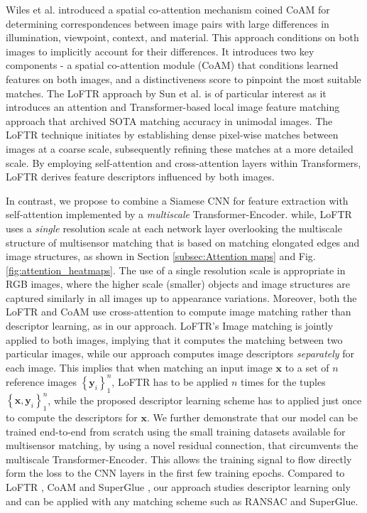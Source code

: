 \documentclass[10pt,journal]{IEEEtran}\usepackage{amsfonts}
\begin{document}
Wiles et al. introduced a spatial co-attention mechanism coined CoAM \cite {CoAM} for determining correspondences between image pairs with large
differences in illumination, viewpoint, context, and material. This approach
conditions on both images to implicitly account for their differences. It
introduces two key components - a spatial co-attention module (CoAM) that
conditions learned features on both images, and a distinctiveness score to
pinpoint the most suitable matches. The LoFTR approach \cite{LoFTR} by Sun
et al. is of particular interest as it introduces an attention and
Transformer-based local image feature matching approach that archived SOTA
matching accuracy in unimodal images. The LoFTR technique initiates by
establishing dense pixel-wise matches between images at a coarse scale,
subsequently refining these matches at a more detailed scale. By employing
self-attention and cross-attention layers within Transformers, LoFTR derives
feature descriptors influenced by both images.

In contrast, we propose to combine a Siamese CNN for feature extraction with
self-attention implemented by a \textit{multiscale} Transformer-Encoder.
while, LoFTR uses a \textit{single} resolution scale at each network layer
overlooking the multiscale structure of multisensor matching that is based
on matching elongated edges and image structures, as shown in Section \ref {subsec:Attention maps} and Fig. \ref{fig:attention_heatmaps}. The use of a
single resolution scale is appropriate in RGB images, where the higher scale
(smaller) objects and image structures are captured similarly in all images
up to appearance variations. Moreover, both the LoFTR \cite{LoFTR} and CoAM
\cite{CoAM} use cross-attention to compute image matching rather than
descriptor learning, as in our approach. LoFTR's Image matching is jointly
applied to both images, implying that it computes the matching between two
particular images, while our approach computes image descriptors \textit{separately} for each image. This implies that when matching an input image $\mathbf{x}$ to a set of $n$ reference images $\left\{ \mathbf{y}_{i}\right\}
_{1}^{n}$, LoFTR has to be applied $n$ times for the tuples $\left\{ \mathbf{x,y}_{i}\right\} _{1}^{n}$, while the proposed descriptor learning scheme
has to applied just once to compute the descriptors for $\mathbf{x}$. We
further demonstrate that our model can be trained end-to-end from scratch
using the small training datasets available for multisensor matching, by
using a novel residual connection, that circumvents the multiscale
Transformer-Encoder. This allows the training signal to flow directly form
the loss to the CNN layers in the first few training epochs. Compared to
LoFTR \cite{LoFTR}, CoAM \cite{CoAM} and SuperGlue \cite{SuperGlue}, our
approach studies descriptor learning only and can be applied with any
matching scheme such as RANSAC \cite{RANSAC} and SuperGlue.
\end{document}
